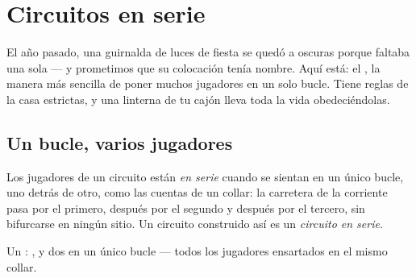 \chapter{Circuitos en serie}\label{ch:g4:series-circuits}

El año pasado, una guirnalda de luces de fiesta se quedó a oscuras
porque faltaba una sola  --- y prometimos que su colocación
tenía nombre. Aquí está: el , la manera más sencilla
de poner muchos jugadores en un solo bucle. Tiene reglas de la casa
estrictas, y una linterna de tu cajón lleva toda la vida
obedeciéndolas.

\section{Un bucle, varios jugadores}

\begin{definition}[En serie]\label{def:g4:series-circuits:series}
Los jugadores de un circuito están \emph{en serie} cuando se sientan en un único bucle, uno detrás de otro, como
las cuentas de un collar: la carretera de la corriente pasa por el
primero, después por el segundo y después por el tercero, sin
bifurcarse en ningún sitio. Un circuito construido así es un
\emph{circuito en serie}.
\end{definition}

\begin{omfigure}

{\small Un : ,  y dos
 en un único bucle --- todos los jugadores ensartados en el
mismo collar.}
\end{omfigure}

